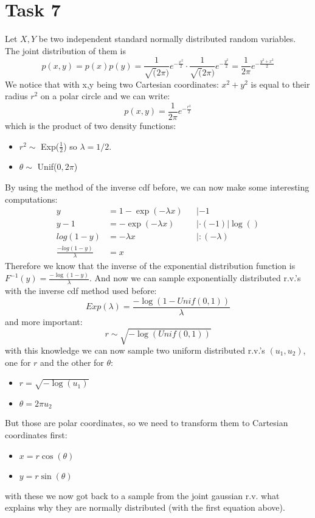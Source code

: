 \documentclass{article}
\begin{document}
\section*{Task 7}
Let $X, Y$ be two independent standard normally distributed random variables. The joint distribution of them is
\[p(x,y) = p(x)p(y) = \frac{1}{\sqrt(2\pi)} e^{-\frac{x^2}{2}} \cdot \frac{1}{\sqrt(2\pi)} e^{-\frac{y^2}{2}} =  \frac{1}{2\pi} e^{-\frac{y^2 + x^2}{2}}\]
We notice that with x,y being two Cartesian coordinates: $x^2 + y^2$ is equal to their radius $r^2$ on a polar circle and we can write:
\[ p(x,y) = \frac{1}{2\pi} e^{-\frac{r^2}{2}}\]
which is the product of two density functions:
\begin{itemize}
	\item $r^2 \sim$ Exp($\frac{1}{2}$) so $\lambda = 1/2$.
	\item $\theta \sim$ Unif($0,2\pi$)
\end{itemize}
By using the method of the inverse cdf before, we can now make some interesting computations:
\begin{align*}
y &= 1-\exp(-\lambda x) &&|-1\\
y-1 &= -\exp(-\lambda x) &&|\cdot(-1) |\log()\\
log(1-y) &= -\lambda x &&|: (-\lambda) \\
\frac{-log(1-y)}{\lambda} &= x &&
\end{align*}
Therefore we know that the inverse of the exponential distribution function is $F^{-1}(y) = \frac{-\log(1-y)}{\lambda}$. And now we can sample exponentially distributed r.v.'s with the inverse cdf method used before:
\[Exp(\lambda) = \frac{-\log(1-Unif(0,1))}{\lambda} \]
and more important:
\[r \sim \sqrt{-\log(Unif(0,1))}\]
with this knowledge we can now sample two uniform distributed r.v.'s $(u_1, u_2)$, one for  $r$ and the other for $\theta$:
\begin{itemize}
	\item $r = \sqrt{-\log(u_1)}$
	\item $\theta = 2\pi u_2$
\end{itemize}
But those are polar coordinates, so we need to transform them to Cartesian coordinates first:
\begin{itemize}
	\item $x = r \cos (\theta)$
	\item $y = r \sin (\theta)$
\end{itemize}
with these we now got back to a sample from the joint gaussian r.v. what explains why they are normally distributed (with the first equation above).
\end{document}

